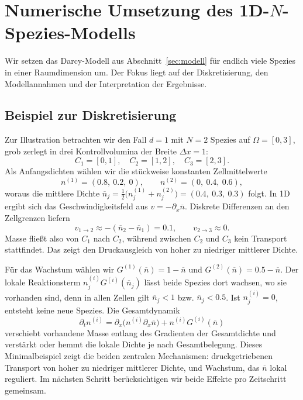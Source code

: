 \documentclass[11pt]{article}
\newcommand{\nbar}{\overline{n}}
\begin{document}
\section{Numerische Umsetzung des 1D-$N$-Spezies-Modells}
\label{sec:1d}
Wir setzen das Darcy-Modell aus Abschnitt~\ref{sec:modell} für endlich viele
Spezies in einer Raumdimension um. Der Fokus liegt auf der Diskretisierung, den
Modellannahmen und der Interpretation der Ergebnisse.

\subsection{Beispiel zur Diskretisierung}
Zur Illustration betrachten wir den Fall $d = 1$ mit $N = 2$ Spezies auf $\Omega =
[0, 3]$, grob zerlegt in drei Kontrollvolumina der Breite $\Delta x = 1$:
\[
    C_1 = [0, 1], \quad C_2 = [1, 2], \quad C_3 = [2, 3].
\]
Als Anfangsdichten wählen wir die stückweise konstanten Zellmittelwerte
\[
    n^{(1)} = (0.8,\ 0.2,\ 0), \qquad n^{(2)} = (0,\ 0.4,\ 0.6),
\]
woraus die mittlere Dichte $\nbar_j = \tfrac{1}{2}\bigl(n^{(1)}_j + n^{(2)}_j\bigr)
= (0.4,\ 0.3,\ 0.3)$ folgt. In 1D ergibt sich das Geschwindigkeitsfeld aus $v =
-\partial_x \nbar$. Diskrete Differenzen an den Zellgrenzen liefern
\[
    v_{1 \to 2} \approx -(\nbar_2 - \nbar_1) = 0.1, \qquad v_{2 \to 3} \approx 0.
\]
Masse fließt also von $C_1$ nach $C_2$, während zwischen $C_2$ und $C_3$ kein
Transport stattfindet. Das zeigt den Druckausgleich von hoher zu niedriger
mittlerer Dichte.

Für das Wachstum wählen wir $G^{(1)}(\nbar) = 1 - \nbar$ und $G^{(2)}(\nbar) = 0.5
- \nbar$. Der lokale Reaktionsterm $n^{(i)}_j G^{(i)}(\nbar_j)$ lässt beide Spezies
dort wachsen, wo sie vorhanden sind, denn in allen Zellen gilt $\nbar_j < 1$ bzw.
$\nbar_j < 0.5$. Ist $n^{(i)}_j = 0$, entsteht keine neue Spezies. Die
Gesamtdynamik
\[
    \partial_t n^{(i)} = \partial_x\bigl( n^{(i)} \partial_x \nbar \bigr)
    + n^{(i)} G^{(i)}(\nbar)
\]
verschiebt vorhandene Masse entlang des Gradienten der Gesamtdichte und verstärkt
oder hemmt die lokale Dichte je nach Gesamtbelegung. Dieses Minimalbeispiel zeigt
die beiden zentralen Mechanismen: druckgetriebenen Transport von hoher zu
niedriger mittlerer Dichte, und Wachstum, das $\nbar$ lokal reguliert. Im nächsten
Schritt berücksichtigen wir beide Effekte pro Zeitschritt gemeinsam.
\end{document}
